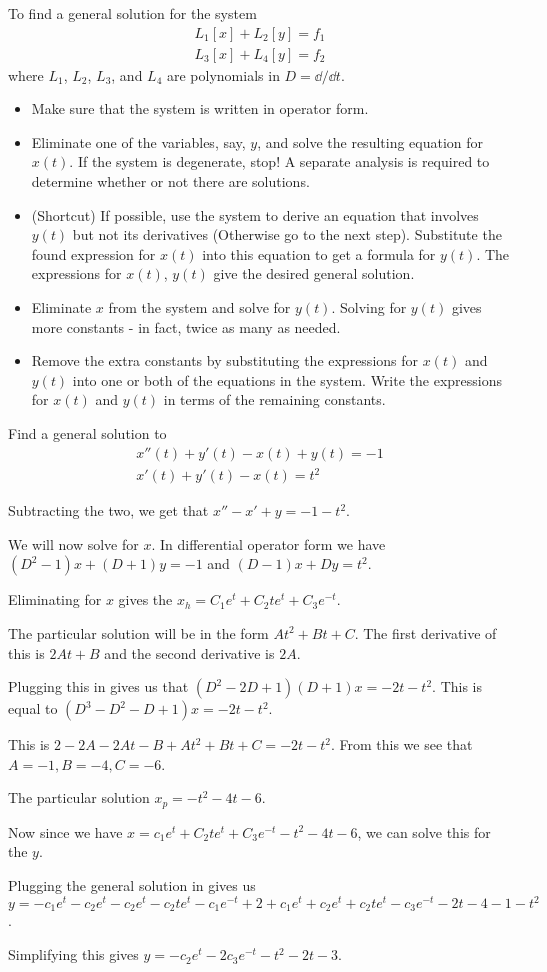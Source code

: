 \documentclass[../diffeq.tex]{subfiles}
\begin{document}
To find a general solution for the system 
\begin{align*}
    L_1[x]+L_2[y]=f_1 \\
    L_3[x]+L_4[y]=f_2    
\end{align*}
where $L_1$, $L_2$, $L_3$, and $L_4$ are polynomials in $D=\dd / \dd t$.
\begin{itemize}
    \item Make sure that the system is written in operator form.
    \item Eliminate one of the variables, say, $y$, and solve the resulting equation for $x(t)$. If the system is degenerate, stop! A separate analysis is required to determine whether or not there are solutions.
    \item (Shortcut) If possible, use the system to derive an equation that involves $y(t)$ but not its derivatives (Otherwise go to the next step). Substitute the found expression for $x(t)$ into this equation to get a formula for $y(t)$. The expressions for $x(t)$, $y(t)$ give the desired general solution.
    \item Eliminate $x$ from the system and solve for $y(t)$. Solving for $y(t)$ gives more constants - in fact, twice as many as needed.
    \item Remove the extra constants by substituting the expressions for $x(t)$ and $y(t)$ into one or both of the equations in the system. Write the expressions for $x(t)$ and $y(t)$ in terms of the remaining constants.
\end{itemize}

\pagebreak
\begin{example}
    Find a general solution to 
    \begin{align*}
        x''(t)+y'(t)-x(t)+y(t)=-1 \\ 
        x'(t)+y'(t)-x(t)=t^2
    \end{align*}

    Subtracting the two, we get that $x''-x'+y=-1-t^2$.

    We will now solve for $x$. In differential operator form we have $(D^2-1)x+(D+1)y=-1$ and $(D-1)x+Dy=t^2$.

    Eliminating for $x$ gives the $x_h=C_1e^t+C_2te^t+C_3e^{-t}$.

    The particular solution will be in the form $At^2+Bt+C$. The first derivative of this is $2At+B$ and the second derivative is $2A$.

    Plugging this in gives us that $(D^2-2D+1)(D+1)x=-2t-t^2$. This is equal to $(D^3-D^2-D+1)x=-2t-t^2$.

    This is $2-2A-2At-B+At^2+Bt+C=-2t-t^2$. From this we see that $A=-1, B=-4, C=-6$.

    The particular solution $x_p=-t^2-4t-6$.

    Now since we have $x=c_1e^t+C_2te^t+C_3e^{-t}-t^2-4t-6$, we can solve this for the $y$.

    Plugging the general solution in gives us $y=-c_1e^t-c_2e^t-c_2e^t-c_2te^t-c_1e^{-t}+2+c_1e^t+c_2e^t+c_2te^t-c_3e^{-t}-2t-4-1-t^2$.

    Simplifying this gives $y=-c_2e^t-2c_3e^{-t}-t^2-2t-3$.
\end{example}
\end{document}
